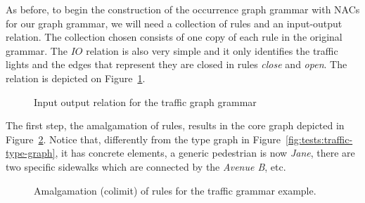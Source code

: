 As before, to begin the construction of the occurrence graph grammar with NACs for our graph grammar, we will need a collection of rules and an input-output relation. The collection chosen consists of one copy of each rule in the original grammar. The $IO$ relation is also very simple and it only identifies the traffic lights and the edges that represent they are closed in rules \emph{close} and \emph{open}. The relation is depicted on Figure~\ref{fig:tests:inout-traffic}.

\begin{figure}[!ht]
\centering
{}
\caption{Input output relation for the traffic graph grammar}\label{fig:tests:inout-traffic}
\end{figure}

The first step, the amalgamation of rules, results in the core graph depicted in Figure~\ref{fig:tests:amalgamation-traffic}. Notice that, differently from the type graph in Figure~\ref{fig:tests:traffic-type-graph}, it has concrete elements, a generic pedestrian is now \emph{Jane}, there are two specific sidewalks which are connected by the \emph{Avenue B}, etc.

\begin{figure}[!ht]
  \centering
  \caption{Amalgamation (colimit) of rules for the traffic grammar example.}\label{fig:tests:amalgamation-traffic}
\end{figure}

